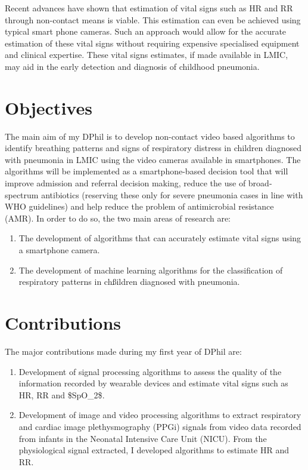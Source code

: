 Recent advances have shown that estimation of vital signs such as HR and RR through non-contact means is viable. This estimation can even be achieved using typical smart phone cameras. Such an approach would allow for the accurate estimation of these vital signs without requiring expensive specialised equipment and clinical expertise. These vital signs estimates, if made available in LMIC, may aid in the early detection and diagnosis of childhood pneumonia. 

\section{Objectives}

The main aim of my DPhil is to develop non-contact video based algorithms to identify breathing patterns and signs of respiratory distress in children diagnosed with pneumonia in LMIC using the video cameras available in smartphones. The algorithms will be implemented as a smartphone-based decision tool that will improve admission and referral decision making, reduce the use of broad-spectrum antibiotics (reserving these only for severe pneumonia cases in line with WHO guidelines) and help reduce the problem of antimicrobial resistance (AMR).  In order to do so, the two main areas of research are:

\begin{enumerate}
\item The development of algorithms that can accurately estimate vital signs using a smartphone camera.
\item The development of machine learning algorithms for the classification of respiratory patterns in chßildren diagnosed with pneumonia.
\end{enumerate}

\section{Contributions}

The major contributions made during my first year of DPhil are:

 \begin{enumerate}
\item Development of signal processing algorithms to assess the quality of the information recorded by wearable devices and estimate vital signs such as HR, RR and \gls{$SpO_2$}.

\item Development of image and video processing algorithms to extract respiratory and cardiac image plethysmography (PPGi) signals from video data recorded from infants in the Neonatal Intensive Care Unit (NICU). From the physiological signal extracted, I developed algorithms to estimate HR and RR.
\end{enumerate}


